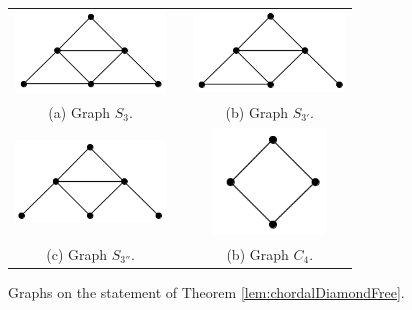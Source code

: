 

\begin{figure}[h]
  \centering
  \begin{tabular}{  c p{0.7cm} c }
    \centering
    \includegraphics[width=4cm]{img/s3.png} & &
    \includegraphics[width=4cm]{img/s3-1.png}
    \\
    \footnotesize \centering 
    (a)  \footnotesize Graph $S_3$. &&  \footnotesize (b) Graph $S_{3'}$. \\
    
      \centering 
      \includegraphics[width=4cm]{img/s3-2.png} & &
    \includegraphics[width=3cm]{img/c4.png}
    \\
    \footnotesize \centering 
    (c)  \footnotesize Graph $S_{3''}$. && \footnotesize (b) Graph $C_{4}$.\\
  \end{tabular}

 \caption{Graphs on the statement of Theorem \ref{lem:chordalDiamondFree}.}
 \label{fig:proibidos}
\end{figure} 





    
